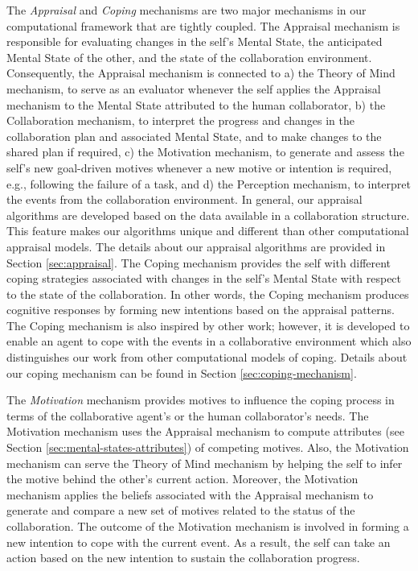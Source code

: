 \documentclass[12pt]{report}
\begin{document}
The \textit{Appraisal} and \textit{Coping} mechanisms are two major
mechanisms in our computational framework that are tightly coupled. The
Appraisal mechanism is responsible for evaluating changes in the self's Mental
State, the anticipated Mental State of the other, and the state of the
collaboration environment. Consequently, the Appraisal mechanism is connected to
a) the Theory of Mind mechanism, to serve as an evaluator whenever the self
applies the Appraisal mechanism to the Mental State attributed to the human
collaborator, b) the Collaboration mechanism, to interpret the progress and
changes in the collaboration plan and associated Mental State, and to make
changes to the shared plan if required, c) the Motivation mechanism, to generate
and assess the self's new goal-driven motives whenever a new motive or intention
is required, e.g., following the failure of a task, and d) the Perception
mechanism, to interpret the events from the collaboration environment.
In general, our appraisal algorithms are developed based on the data available
in a collaboration structure. This feature makes our algorithms unique and
different than other computational appraisal models. The details about our
appraisal algorithms are provided in Section \ref{sec:appraisal}. The Coping
mechanism provides the self with different coping strategies associated with changes in
the self's Mental State with respect to the state of the collaboration. In
other words, the Coping mechanism produces cognitive responses by forming new
intentions based on the appraisal patterns. The Coping mechanism is also
inspired by other work; however, it is developed to enable an agent to cope with
the events in a collaborative environment which also distinguishes our work from
other computational models of coping. Details about our coping mechanism can be
found in Section \ref{sec:coping-mechanism}.

The \textit{Motivation} mechanism provides motives to influence the coping
process in terms of the collaborative agent's or the human collaborator's needs.
The Motivation mechanism uses the Appraisal mechanism to compute attributes (see
Section \ref{sec:mental-states-attributes}) of competing motives. Also, the
Motivation mechanism can serve the Theory of Mind mechanism by helping the self
to infer the motive behind the other's current action. Moreover, the Motivation
mechanism applies the beliefs associated with the Appraisal mechanism to
generate and compare a new set of motives related to the status of the
collaboration. The outcome of the Motivation mechanism is involved in forming a
new intention to cope with the current event. As a result, the self can take an
action based on the new intention to sustain the collaboration progress.
\end{document}
